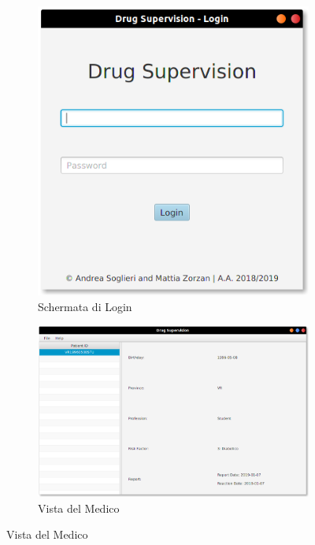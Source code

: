 \documentclass[a4paper, 11pt]{article}
\begin{document}
		\begin{figure}[H]
			\begin{subfigure}[h]{\textwidth}
				\centering
				\includegraphics[height=0.3\textheight]{Login-view.png}
				\caption{Schermata di Login}
			\end{subfigure}
		
			\begin{subfigure}[h]{\textwidth}
				\centering
				\includegraphics[height=0.3\textheight]{Medic-view.png}
				\caption{Vista del Medico}
			\end{subfigure}
		

\end{figure}
\end{document}
